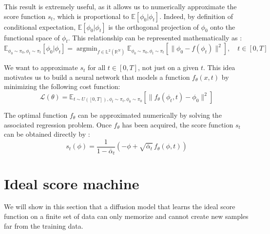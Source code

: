 \documentclass[a4paper,10pt]{article}
\theoremstyle{definition} %
\theoremstyle{definition} %
\theoremstyle{definition} %
\theoremstyle{definition} %
\newcommand{\argmin}{\mathop{\mathrm{argmin}}}
\begin{document}
This result is extremely useful, as it allows us to numerically approximate the score function $s_t$, which is proportional to $\mathbb{E}[\phi_0 | \phi_t]$. Indeed, by definition of conditional expectation, $\mathbb{E}[\phi_0 | \phi_t]$ is the orthogonal projection of $\phi_0$ onto the functional space of $\phi_t$. This relationship can be represented mathematically as :
\[
\mathbb{E}_{\phi_0 \sim \pi_0, \phi_t \sim \pi_t}[\phi_0 | \phi_t] = \argmin_{f \in \mathbb{L}^2(\mathbb{R}^N)} \mathbb{E}_{\phi_0 \sim \pi_0, \phi_t \sim \pi_t}\left[ \| \phi_0 - f(\phi_t) \|^2 \right], \quad t \in [0,T]
\]



We want to approximate $s_t$ for all $t \in [0,T]$, not just on a given $t$. This idea motivates us to build a neural network that models a function $f_\theta(x,t)$ by minimizing the following cost function:
\[
\mathcal{L}(\theta) = \mathbb{E}_{t \sim U([0,T]), \phi_t \sim \pi_t, \phi_0 \sim \pi_0} \left[ \| f_\theta(\phi_t,t) - \phi_ 0\|^2 \right]
\]


The optimal function $f_\theta$ can be approximated numerically by solving the associated regression problem. Once $f_\theta$ has been acquired, the score function $s_t$ can be obtained directly by :
\[
s_t(\phi)= \frac{1}{1 - \bar \alpha_t} \left( -\phi + \sqrt{\bar \alpha_t} \, f_\theta(\phi,t) \right)
\]


\section{Ideal score machine}

We will show in this section that a diffusion model that learns the ideal score function on a finite set of data can only memorize and cannot create new samples far from the training data.
\end{document}
